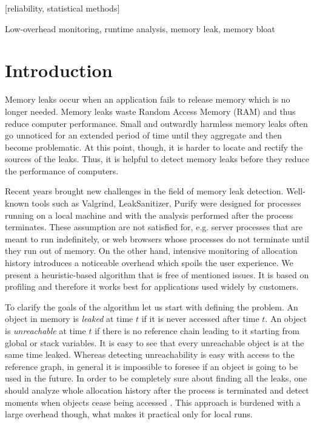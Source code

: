\documentclass[preprint, numbers]{sigplanconf}
\newcommand{\todo}[1]{{\color{red}{(TODO: #1)}}}
\begin{document}
[reliability, statistical methods]

\terms

\keywords
Low-overhead monitoring, runtime analysis, memory leak, memory bloat

\section{Introduction}

Memory leaks occur when an application fails to release memory which is no longer needed.
Memory leaks waste Random Access Memory (RAM) and thus reduce computer performance.
Small and outwardly harmless memory leaks often go unnoticed for an extended period
of time until they aggregate and then become problematic.
At this point, though, it is harder to locate and rectify the sources of the leaks.
Thus, it is helpful to detect memory leaks before they reduce the performance of computers.

Recent years brought new challenges in the field of memory leak detection.
Well-known tools such as Valgrind, LeakSanitizer, Purify \cite{valgrind, leak-san, purify} were designed
for processes running on a local machine and with the analysis
performed after the process terminates.
These assumption are not satisfied for, e.g. server processes
that are meant to run indefinitely, or web browsers whose processes
do not terminate until they run out of memory.
On the other hand, intensive monitoring of allocation history
introduces a noticeable overhead which spoils the user experience.
We present a heuristic-based algorithm that is free of mentioned issues.
It is based on profiling and therefore it works best for applications used widely
by customers.

To clarify the goals of the algorithm let us start with defining the problem.
An object in memory is \textit{leaked} at time $t$ if it is never accessed
after time $t$.
An object is \textit{unreachable} at time $t$ if there is no reference chain
leading to it starting from global or stack variables.
It is easy to see that every unreachable object is at the same time leaked.
Whereas detecting unreachability is easy with access to the reference graph,
in general it is impossible to foresee if an object is going to be used in the future.
In order to be completely sure about finding all the leaks, one should analyze whole
allocation history after the process is terminated and detect moments when objects cease being accessed
\todo{any profiler working like this?}.
This approach is burdened with a large overhead though, what makes it practical only
for local runs.
\end{document}
